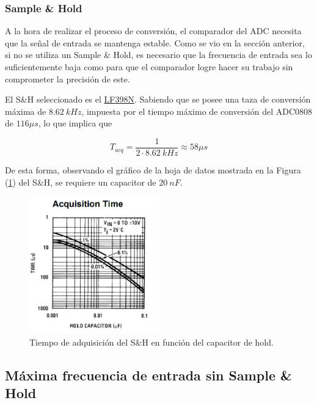 \subsubsection{Sample \& Hold}

A la hora de realizar el proceso de conversión, el comparador del ADC necesita que la señal de entrada se mantenga estable. Como se vio en la sección anterior, si no se utiliza un Sample \& Hold, es necesario que la frecuencia de entrada sea lo suficientemente baja como para que el comparador logre hacer su trabajo sin comprometer la precisión de este.

El S\&H seleccionado es el \href{https://pdf1.alldatasheet.es/datasheet-pdf/view/8580/NSC/LF398N.html}{LF398N}. Sabiendo que se posee una taza de conversión máxima de $8.62 \ kHz$, impuesta por el tiempo máximo de conversión del ADC0808 de $116 \mu s$, lo que implica que

\begin{equation*}
	T_{acq} = \frac{1}{2\cdot 8.62 \ kHz} \approx 58 \mu s
\end{equation*}

De esta forma, observando el gráfico de la hoja de datos mostrada en la Figura (\ref{chacqtime}) del S\&H, se requiere un capacitor de $20 \ nF$.

\begin{figure}[H]
	\centering
	\includegraphics[width=0.5\textwidth]{ImagenesEjercicio1/chacqtime.png}
\caption{Tiempo de adquisición del S\&H en función del capacitor de hold.}
	\label{chacqtime}
\end{figure}

\subsection{Máxima frecuencia de entrada sin Sample \& Hold}

